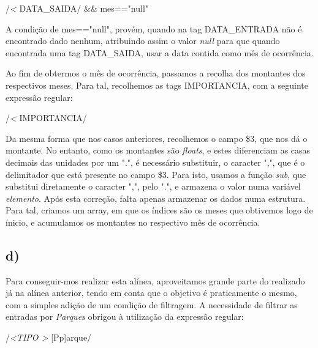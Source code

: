 \documentclass[12pt,a4paper]{report}
\begin{document}
\begin{center}
\vspace{0.3cm}
/\^\emph{\textless} DATA\_SAIDA/ \&\& mes=="null" \par
\vspace{0.3cm}
\end{center}

\noindent A condição de mes=="null", provém, quando na tag DATA\_ENTRADA não é encontrado dado nenhum, atribuindo assim o valor \emph{null} para que quando encontrada uma tag DATA\_SAIDA, usar a data contida como mês de ocorrência. \par
\noindent Ao fim de obtermos o mês de ocorrência, passamos a recolha dos montantes dos respectivos meses. Para tal, recolhemos as tags IMPORTANCIA, com a seguinte expressão regular:

\begin{center}
\vspace{0.3cm}
/\^\emph{\textless} IMPORTANCIA/ \par
\vspace{0.3cm}
\end{center}

\noindent Da mesma forma que nos casos anteriores, recolhemos o campo \$3, que nos dá o montante. No entanto, como os montantes são \emph{floats}, e estes diferenciam as casas decimais das unidades por um ".", é necessário substituir, o caracter ",", que é o delimitador que está presente no campo \$3. Para isto, usamos a função \emph{sub}, que substitui diretamente o caracter ",", pelo ".", e armazena o valor numa variável \emph{elemento}. Após esta correção, falta apenas armazenar os dados numa estrutura. Para tal, criamos um array, em que os índices são os meses que obtivemos logo de ínicio, e acumulamos os montantes no respectivo mês de ocorrência.

\subsection{d)}
Para conseguir-mos realizar esta alínea, aproveitamos grande parte do realizado já na alínea anterior, tendo em conta que o objetivo é praticamente o mesmo, com a simples adição de um condição de filtragem. A necessidade de filtrar as entradas por \emph{Parques} obrigou à utilização da expressão regular:

\begin{center}
\vspace{0.3cm}
/\^\emph{\textless TIPO \textgreater} [Pp]arque/ \par
\vspace{0.3cm}
\end{center}
\end{document}
